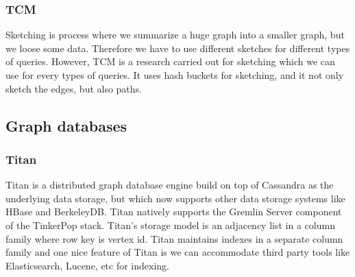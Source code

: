 \documentclass[12pt]{article}
\begin{document}
\subsubsection{TCM}
Sketching is process where we summarize a huge graph into a smaller graph, but we loose some data. Therefore we have to use different sketches for different types of queries. However, TCM is a research carried out for sketching which we can use for every types of queries. It uses hash buckets for sketching, and it not only sketch the edges, but also paths.

\subsection{Graph databases}

\subsubsection{Titan}
Titan is a distributed graph database engine build on top of Cassandra as the underlying data storage, but which now supports other data storage systems like HBase and BerkeleyDB. Titan natively supports the Gremlin Server component of the TinkerPop stack. Titan’s storage model is an adjacency list in a column family where row key is vertex id. Titan maintains indexes in a separate column family and one nice feature of Titan is we can accommodate third party tools like Elasticsearch, Lucene, etc for indexing.
\end{document}
